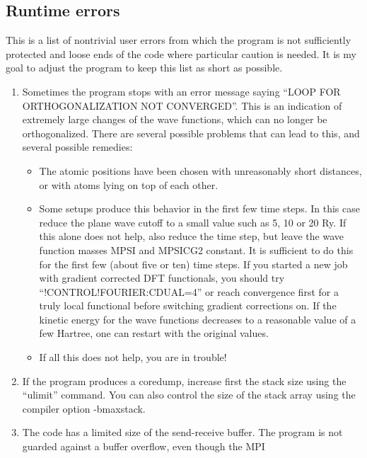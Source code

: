 \documentclass[final,12pt,makeidx,DIV=calc]{article}
\begin{document}
{{{{{{\begin{itemize}
\end{itemize}



\subsection{Runtime errors}

This is a list of nontrivial user errors from which the program is not
sufficiently protected and loose ends of the code where particular
caution is needed. It is my goal to adjust the program to
keep this list as short as possible.

\begin{enumerate}
\item Sometimes the program stops with an error message saying 
  ``LOOP FOR ORTHOGONALIZATION NOT CONVERGED''. This is an indication
  of extremely large changes of the wave functions, which can no
  longer be orthogonalized. There are several possible problems that can
  lead to this, and several possible remedies: 
  \begin{itemize}
  \item The atomic positions have been chosen with unreasonably short
    distances, or with atoms lying on top of each other.
  \item Some setups produce this behavior in the first few time steps.
    In this case reduce the plane wave cutoff to a small value such as
    5, 10 or 20 Ry. If this alone does not help, also reduce the time
    step, but leave the wave function masses MPSI and MPSICG2
    constant. It is sufficient to do this for the first few (about five
    or ten) time steps. If you started a new job with gradient
    corrected DFT functionals, you should try
    ``!CONTROL!FOURIER:CDUAL=4'' or reach convergence first for a
    truly local functional before switching gradient corrections
    on. If the kinetic energy for the wave functions decreases to a
    reasonable value of a few Hartree, one can restart with the
    original values.
  \item If all this does not help, you are in trouble!
  \end{itemize}
\item If the program produces a coredump, increase first the stack size
  using the ``ulimit'' command. You can also control the size of the stack
  array using the compiler option -bmaxstack.
\item The code has a limited size of the send-receive buffer. The
  program is not guarded against a buffer overflow, even though the MPI

\end{enumerate}}}}}}}
\end{document}
